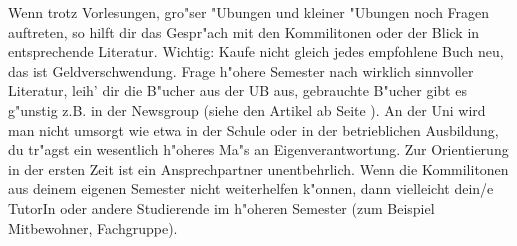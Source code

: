 Wenn trotz Vorlesungen, gro"ser "Ubungen und kleiner "Ubungen noch Fragen
auftreten, so hilft dir das Gespr"ach mit den Kommilitonen oder der Blick in
entsprechende Literatur.
Wichtig: Kaufe nicht gleich jedes empfohlene Buch neu,
das ist Geldverschwendung. Frage h"ohere Semester nach wirklich sinnvoller
Literatur, leih' dir die B"ucher aus der UB aus, gebrauchte B"ucher gibt es
g"unstig z.B. in der Newsgroup  (siehe den Artikel
ab Seite \pageref{elekinf}). An der Uni wird man nicht umsorgt wie etwa in der
Schule oder in der betrieblichen Ausbildung, du tr"agst ein wesentlich h"oheres
Ma"s an Eigenverantwortung. Zur Orientierung in der ersten Zeit ist ein
Ansprechpartner unentbehrlich. Wenn die Kommilitonen aus
deinem eigenen Semester nicht weiterhelfen k"onnen, dann vielleicht dein/e TutorIn oder andere
Studierende im h"oheren Semester (zum Beispiel Mitbewohner, Fachgruppe).
